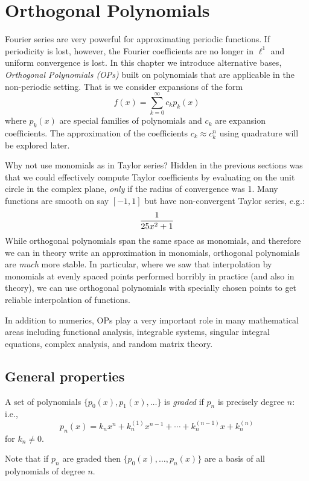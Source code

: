 
\section{Orthogonal Polynomials}
Fourier series are very powerful for approximating periodic functions. If periodicity is lost, however, the Fourier coefficients are no longer in $\ensuremath{\ell}^1$ and uniform convergence is lost. In this chapter we introduce alternative bases, \emph{Orthogonal Polynomials (OPs)} built on polynomials that are applicable in the non-periodic setting. That is we consider expansions of the form
\[
f(x) = \sum_{k=0}^\ensuremath{\infty} c_k p_k(x)
\]
where $p_k(x)$ are special families of polynomials and $c_k$ are expansion coefficients. The approximation of the coefficients $c_k \ensuremath{\approx} c_k^n$ using quadrature will be explored later.

Why not use monomials as in Taylor series? Hidden in the previous sections was that we could effectively compute Taylor coefficients by evaluating on the unit circle in the complex plane, \emph{only} if the radius of convergence was 1. Many functions are smooth on say $[-1,1]$ but have non-convergent Taylor series, e.g.:
\[
{1 \over 25x^2 + 1}
\]
While orthogonal polynomials span the same space as monomials, and therefore we can in theory write an approximation in monomials, orthogonal polynomials are \emph{much} more stable. In particular, where we saw that interpolation by monomials at evenly spaced points performed horribly in practice (and also in theory), we can use orthogonal polynomials with specially chosen points to get reliable interpolation of functions. 

In addition to numerics, OPs play a very important role in many mathematical areas including functional analysis, integrable systems, singular integral equations, complex analysis, and random matrix theory.

\subsection{General properties}
\begin{definition} A set of polynomials $\{p_0(x), p_1(x), \ensuremath{\ldots} \}$ is \emph{graded} if $p_n$ is precisely degree $n$: i.e.,
\[
p_n(x) = k_n x^n + k_n^{(1)} x^{n-1} + \ensuremath{\cdots} + k_n^{(n-1)} x + k_n^{(n)}
\]
for $k_n \ensuremath{\neq} 0$. \end{definition}

Note that if $p_n$ are graded then $\{p_0(x), \ensuremath{\ldots}, p_n(x) \}$ are a basis of all polynomials of degree $n$.

